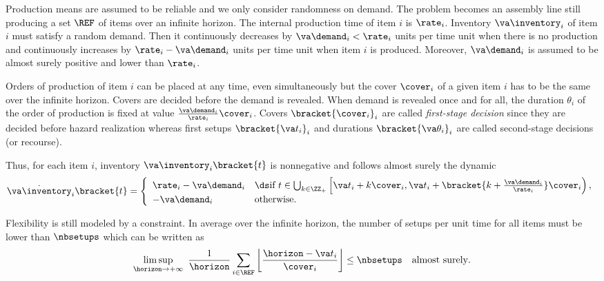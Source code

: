Production means are assumed to be reliable and we only consider randomness on demand.
The problem becomes an assembly line still producing a set $\REF$ of items over an infinite horizon.
The internal production time of item $i$ is $\rate_i$.
Inventory $\va\inventory_i$ of item $i$ must satisfy a random demand.
Then it continuously decreases by $\va\demand_i<\rate_i$ units per time unit when there is no production and continuously increases by $\rate_i-\va\demand_i$ units per time unit when item $i$ is produced.
Moreover, $\va\demand_i$ is assumed to be almost surely positive and lower than $\rate_i$.


Orders of production of item $i$ can be placed at any time, even simultaneously but the cover $\cover_i$ of a given item $i$ has to be the same over the infinite horizon.
Covers are decided before the demand is revealed.
When demand is revealed once and for all, the duration $\theta_i$ of the order of production is fixed at value $\frac{\va\demand_i}{\rate_i}\cover_i$.
Covers $\bracket{\cover_i}_i$ are called \emph{first-stage decision} since they are decided before hazard realization whereas first setups $\bracket{\va t_i}_i$ and durations $\bracket{\va\theta_i}_i$ are called second-stage decisions (or recourse).


Thus, for each item $i$, inventory $\va\inventory_i\bracket{t}$ is nonnegative and follows almost surely the dynamic
\begin{equation}\label{eq:lot-size:single-line:stochastic:motivations:dynamic}
  \dot{\va\inventory}_i\bracket{t} =
  \left\{
  \begin{array}{ll}
  \rate_i-\va\demand_i
  & \ds\mbox{if}\ t\in\bigcup_{k\in\ZZ_+} \left[\va t_i+k\cover_i,\va t_i+\bracket{k+\frac{\va\demand_i}{\rate_i}}\cover_i\right),
  \\
  -\va\demand_i
  & \mbox{otherwise}.
  \end{array}
  \right.
\end{equation}


Flexibility is still modeled by a constraint.
In average over the infinite horizon, the number of setups per unit time for all items must be lower than $\nbsetups$ which can be written as
\begin{equation}\label{eq:lot-size:single-line:stochastic:motivations:flexibility}
  \limsup_{\horizon\rightarrow+\infty}\ \frac{1}{\horizon} \sum_{i\in\REF} \left\lfloor\frac{\horizon-\va t_i}{\cover_i}\right\rfloor \le \nbsetups \quad \mbox{almost surely}.
\end{equation}


